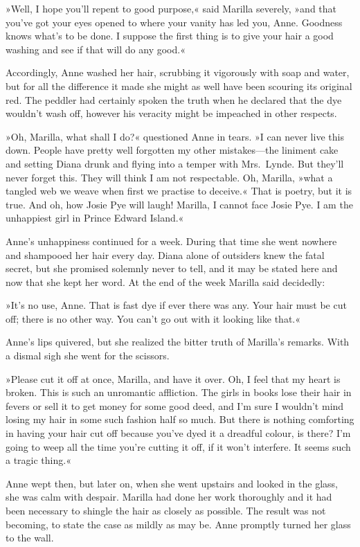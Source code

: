 »Well, I hope you'll repent to good purpose,« said Marilla severely, »and that you've got your eyes opened to where your vanity has led you, Anne. Goodness knows what's to be done. I suppose the first thing is to give your hair a good washing and see if that will do any good.«

Accordingly, Anne washed her hair, scrubbing it vigorously with soap and water, but for all the difference it made she might as well have been scouring its original red. The peddler had certainly spoken the truth when he declared that the dye wouldn't wash off, however his veracity might be impeached in other respects.

»Oh, Marilla, what shall I do?« questioned Anne in tears. »I can never live this down. People have pretty well forgotten my other mistakes—the liniment cake and setting Diana drunk and flying into a temper with Mrs.~Lynde. But they'll never forget this. They will think I am not respectable. Oh, Marilla, »what a tangled web we weave when first we practise to deceive.« That is poetry, but it is true. And oh, how Josie Pye will laugh! Marilla, I cannot face Josie Pye. I am the unhappiest girl in Prince Edward Island.«

Anne's unhappiness continued for a week. During that time she went nowhere and shampooed her hair every day. Diana alone of outsiders knew the fatal secret, but she promised solemnly never to tell, and it may be stated here and now that she kept her word. At the end of the week Marilla said decidedly:

»It's no use, Anne. That is fast dye if ever there was any. Your hair must be cut off; there is no other way. You can't go out with it looking like that.«

Anne's lips quivered, but she realized the bitter truth of Marilla's remarks. With a dismal sigh she went for the scissors.

»Please cut it off at once, Marilla, and have it over. Oh, I feel that my heart is broken. This is such an unromantic affliction. The girls in books lose their hair in fevers or sell it to get money for some good deed, and I'm sure I wouldn't mind losing my hair in some such fashion half so much. But there is nothing comforting in having your hair cut off because you've dyed it a dreadful colour, is there? I'm going to weep all the time you're cutting it off, if it won't interfere. It seems such a tragic thing.«

Anne wept then, but later on, when she went upstairs and looked in the glass, she was calm with despair. Marilla had done her work thoroughly and it had been necessary to shingle the hair as closely as possible. The result was not becoming, to state the case as mildly as may be. Anne promptly turned her glass to the wall.

